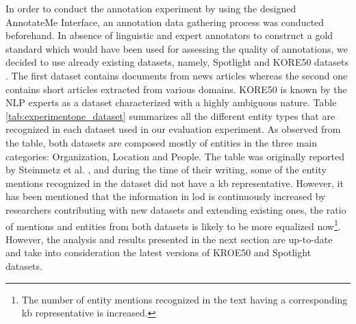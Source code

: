 In order to conduct the annotation experiment by using the designed AnnotateMe Interface, an annotation data gathering process was conducted beforehand. In absence of linguistic and expert annotators to construct a gold standard which would have been used for assessing the quality of annotations, we decided to use already existing datasets, namely, Spotlight and KORE50 datasets \cite{datasets-ex1}. The first dataset contains documents from news articles whereas the second one contains short articles extracted from various domains. KORE50 is known by the NLP experts as a dataset characterized with a highly ambiguous nature. Table \ref{tab:experimentone_dataset} summarizes all the different entity types that are recognized in each dataset used in our evaluation experiment. As observed from the table, both datasets are composed mostly of entities in the three main categories: Organization, Location and People. The table was originally reported by Steinmetz et al. \cite{datasets-ex1}, and during the time of their writing, some of the entity mentions recognized in the dataset did not have a \ac{kb} representative. However, it has been mentioned that the information in \ac{lod} is continuously increased by researchers contributing with new datasets and extending existing ones, the ratio of mentions and entities from both datasets is likely to be more equalized now\footnote{The number of entity mentions recognized in the text having a corresponding \ac{kb} representative is increased.}. However, the analysis and results presented in the next section are up-to-date and take into consideration the latest versions of KROE50 and Spotlight datasets. 

